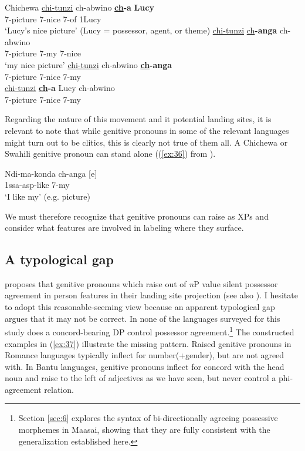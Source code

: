 \documentclass[output=paper
,modfonts
,nonflat]{langsci/langscibook}
\begin{document}
\begin{exe}
	\ex  Chichewa \label{ex:35}
	\xlist
	\ex
	\gll \underline{chi}\underline{-tunzi}     ch-abwino     \textbf{\underline{ch}-a}   \textbf{Lucy}\\
	7-picture   7-nice         7-of   1Lucy\\
	\glt `Lucy's nice picture'  (Lucy = possessor, agent, or theme) 	
	\ex 
	\gll \underline{chi}\underline{-tunzi}      \underline{ch}\textbf{-anga}     ch-abwino\\
	7-picture   7-my         7-nice\\
	\glt `my nice picture'
	\ex
	\gll  *\underline{chi}\underline{-tunzi}    ch-abwino     \textbf{\underline{ch}-anga}\\
	7-picture   7-nice      7-my\\
	\ex
	\gll  *\underline{chi}\underline{-tunzi}    \textbf{\underline{ch}-a} Lucy     ch-abwino\\
	7-picture   7-nice      7-my\\
	\endxlist
\end{exe}
Regarding the nature of this movement and it potential landing sites, it is relevant to note that while genitive pronouns in some of the relevant languages might turn out to be clitics, this is clearly not true of them all. A Chichewa or Swahili genitive pronoun can stand alone ((\ref{ex:36}) from \citealt[295]{Carstens1997}).

\begin{exe}
\ex \label{ex:36}
\gll Ndi-ma-konda  ch-anga [e]\\
1ssa-asp-like     7-my\\
\glt *`I like my' (e.g. picture)
\end{exe}
We must therefore recognize that genitive pronouns can raise as XPs and consider what features are involved in labeling where they surface. 

\subsection{A typological gap} \label{sec:5.2}
\citet{Giusti2008} proposes that genitive pronouns which raise out of \textit{n}P value silent possessor agreement in person features in their landing site projection (see also \citealt{Sichel2002}). I hesitate to adopt this reasonable-seeming view because an apparent typological gap argues that it may not be correct. In none of the languages surveyed for this study does a concord-bearing DP control possessor agreement.\footnote{Section \ref{sec:6} explores the syntax of bi-directionally agreeing possessive morphemes in Maasai, showing that they are fully consistent with the generalization established here.} The constructed examples in (\ref{ex:37}) illustrate the missing pattern. Raised genitive pronouns in Romance languages typically inflect for number(+gender), but are not agreed with. In Bantu languages, genitive pronouns inflect for concord with the head noun and raise to the left of adjectives as we have seen, but never control a phi-agreement relation. 
\end{document}
